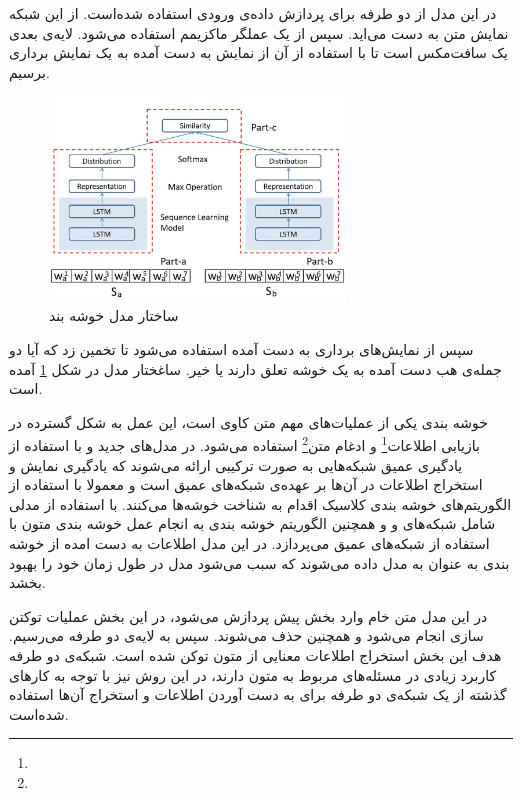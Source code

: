 \documentclass[12pt, a4paper, oneside]{report}
\begin{document}
در این مدل از
دو طرفه برای پردازش داده‌ی ورودی استفاده شده‌است. از این شبکه نمایش متن به دست می‌اید. سپس از یک عملگر
ماکزیمم استفاده می‌شود. لایه‌ی بعدی یک سافت‌مکس است تا با استفاده از آن از نمایش به دست آمده
به یک نمایش برداری برسیم.

\begin{figure}[!ht]
    \centering
    \includegraphics[width=0.7\textwidth]{e2e}
    \caption{ساختار مدل خوشه بند }
    \label{fig:e2e}
\end{figure}

سپس از نمایش‌های برداری به دست آمده استفاده می‌شود تا تخمین زد که آیا دو جمله‌ی هب دست آمده به یک
خوشه تعلق دارند یا خیر. ساغختار مدل در شکل
\ref{fig:e2e}
آمده است.

خوشه بندی یکی از عملیات‌های مهم متن کاوی است، این عمل به شکل گسترده در
بازیابی اطلاعات\footnote{}
و
ادغام متن\footnote{}
استفاده می‌شود. در مدل‌های جدید و با استفاده از یادگیری عمیق شبکه‌هایی به صورت ترکیبی ارائه می‌شوند که
یادگیری نمایش و استخراج اطلاعات در آن‌ها بر عهده‌ی شبکه‌های عمیق است و معمولا با استفاده از 
الگوریتم‌های خوشه بندی کلاسیک اقدام به شناخت خوشه‌ها می‌کنند.
\cite{fan2018neural}
با استفاده از مدلی شامل
شبکه‌های‌
و
و همچنین الگوریتم خوشه بندی
به انجام عمل خوشه بندی متون با استفاده از شبکه‌های عمیق می‌پردازد. در این مدل اطلاعات به دست امده
از خوشه بندی به عنوان
به مدل داده می‌شوند که سبب می‌شود مدل در طول زمان خود را بهبود بخشد.

در این مدل متن خام وارد بخش پیش پردازش می‌شود، در این بخش عملیات توکتن سازی انجام می‌شود و همچنین
حذف می‌شوند. سپس به لایه‌ی
دو طرفه می‌رسیم. هدف این بخش استخراج اطلاعات معنایی از متون توکن شده است. شبکه‌ی
دو طرفه کاربرد زیادی در مسئله‌های مربوط به متون دارند، در این روش نیز با توجه به کار‌های گذشته از یک
شبکه‌ی دو طرفه برای به دست آوردن اطلاعات و استخراج آن‌ها استفاده شده‌است.
\end{document}
